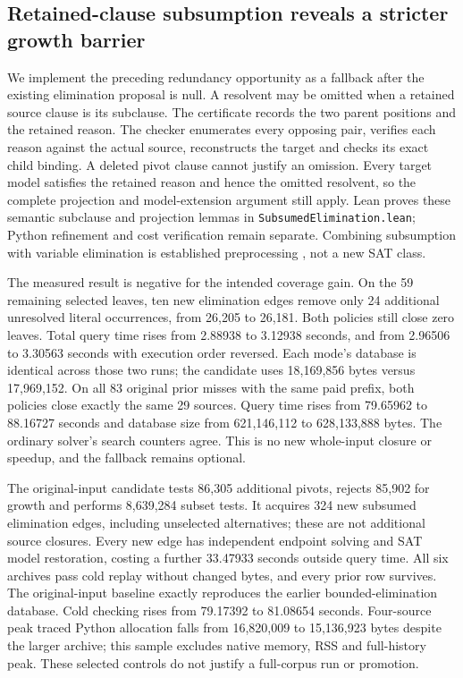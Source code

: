 \documentclass[11pt,a4paper]{article}
\numberwithin{equation}{section}
\theoremstyle{plain}
\theoremstyle{definition}
\theoremstyle{remark}
\begin{document}
\subsection{Retained-clause subsumption reveals a stricter growth barrier}
\label{sec:subsumed-elimination}

We implement the preceding redundancy opportunity as a fallback after the existing elimination proposal is null. A resolvent may be omitted when a retained source clause is its subclause. The certificate records the two parent positions and the retained reason. The checker enumerates every opposing pair, verifies each reason against the actual source, reconstructs the target and checks its exact child binding. A deleted pivot clause cannot justify an omission. Every target model satisfies the retained reason and hence the omitted resolvent, so the complete projection and model-extension argument still apply. Lean proves these semantic subclause and projection lemmas in \texttt{SubsumedElimination.lean}; Python refinement and cost verification remain separate. Combining subsumption with variable elimination is established preprocessing \citep{eenbiere2005}, not a new SAT class.

The measured result is negative for the intended coverage gain. On the 59 remaining selected leaves, ten new elimination edges remove only 24 additional unresolved literal occurrences, from 26,205 to 26,181. Both policies still close zero leaves. Total query time rises from 2.88938 to 3.12938 seconds, and from 2.96506 to 3.30563 seconds with execution order reversed. Each mode's database is identical across those two runs; the candidate uses 18,169,856 bytes versus 17,969,152. On all 83 original prior misses with the same paid prefix, both policies close exactly the same 29 sources. Query time rises from 79.65962 to 88.16727 seconds and database size from 621,146,112 to 628,133,888 bytes. The ordinary solver's search counters agree. This is no new whole-input closure or speedup, and the fallback remains optional.

The original-input candidate tests 86,305 additional pivots, rejects 85,902 for growth and performs 8,639,284 subset tests. It acquires 324 new subsumed elimination edges, including unselected alternatives; these are not additional source closures. Every new edge has independent endpoint solving and SAT model restoration, costing a further 33.47933 seconds outside query time. All six archives pass cold replay without changed bytes, and every prior row survives. The original-input baseline exactly reproduces the earlier bounded-elimination database. Cold checking rises from 79.17392 to 81.08654 seconds. Four-source peak traced Python allocation falls from 16,820,009 to 15,136,923 bytes despite the larger archive; this sample excludes native memory, RSS and full-history peak. These selected controls do not justify a full-corpus run or promotion.
\end{document}
